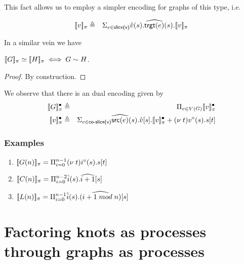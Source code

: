 \documentclass[]{llncs}
\begin{document}
This fact allows us to employ a simpler encoding for graphs of this type, i.e.

\begin{eqnarray}\label{vcode}
  [\![ v ]\!]_{\pi} & \triangleq & \Sigma_{e \in \textsf{slice(v)}} \hat{v}(s).\widehat{\textsf{trgt}(e)}(s).[\![ v ]\!]_{\pi}
\end{eqnarray}

In a similar vein we have

\begin{theorem}\label{grapheqthm}
  $[\![ G ]\!]_{\pi} \simeq [\![ H ]\!]_{\pi} \iff  G \sim H$.
\end{theorem}

\begin{proof}
  By construction.
\end{proof}

\begin{remark}
  We observe that there is an dual encoding given by
  \begin{eqnarray}
  \meaningof{G}_{\pi}^{\bullet} & \triangleq & \Pi_{v \in V(G)}\meaningof{v}_{\pi}^{\bullet} \\
  \meaningof{v}_{\pi}^{\bullet} & \triangleq & \Sigma_{e \in \textsf{co-slice(v)}} \widehat{\textsf{src}(e)}(s).\hat{v}[s].\meaningof{v}_{\pi}^{\bullet} + (\nu \; t)v^{\circ}(s).s[t]
\end{eqnarray}
\end{remark}

\subsubsection{Examples}

\begin{example}
  \begin{enumerate}
    \item $[\![ G(n) ]\!]_{\pi} = \Pi_{i=0}^{n-1}(\nu \; t)i^{\circ}(s).s[t]$

    \item $[\![ C(n) ]\!]_{\pi} = \Pi_{i=0}^{n-2}\hat{i}(s).\widehat{i+1}[s]$

    \item $[\![ L(n) ]\!]_{\pi} = \Pi_{i=0}^{n-1}\hat{i}(s).\widehat{(i+1 \; mod \; n)}[s]$
  \end{enumerate}
\end{example}

\section{Factoring knots as processes through graphs as processes} \label{MainThm}
\end{document}
